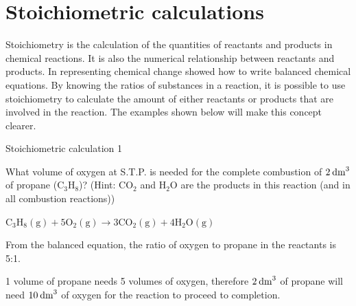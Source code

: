             \section{Stoichiometric calculations}
            \nopagebreak
      \label{m38712*id283990}Stoichiometry is the calculation of the quantities of reactants and products in chemical reactions. It is also the numerical relationship between reactants and products. In  representing chemical change showed how to write balanced chemical equations. By knowing the ratios of substances in a reaction, it is possible to use stoichiometry to calculate the amount of either reactants or products that are involved in the reaction. The examples shown below will make this concept clearer.\par 
\label{m38712*secfhsst!!!underscore!!!id1903}\vspace{.5cm}  
      \begin{wex}{Stoichiometric calculation 1 }
{

      \label{m38712*probfhsst!!!underscore!!!id1904}
      \label{m38712*id275479}What volume of oxygen at S.T.P. is needed for the complete combustion of $2\phantom{\rule{2pt}{0ex}}{\mathrm{dm}}^{3}$ of propane ($\mathrm{C}{}_{3}\mathrm{H}{}_{8}$)? (Hint: $\mathrm{CO}{}_{2}$ and $\mathrm{H}{}_{2}\mathrm{O}$ are the products in this reaction (and in all combustion reactions))\par 
      \vspace{5pt}}
{
      \label{m38712*id284189}${\mathrm{C}}_{3}{\mathrm{H}}_{8}\left(\mathrm{g}\right)+5{\mathrm{O}}_{2}\left(\mathrm{g}\right)\to 3\mathrm{C}{\mathrm{O}}_{2}\left(\mathrm{g}\right)+4{\mathrm{H}}_{2}\mathrm{O}\left(\mathrm{g}\right)$
      \par 
      \label{m38712*id284294}From the balanced equation, the ratio of oxygen to propane in the reactants is 5:1.\par 
      \label{m38712*id284304}1 volume of propane needs 5 volumes of oxygen, therefore $2\phantom{\rule{2pt}{0ex}}{\mathrm{dm}}^{3}$ of propane will need $10\phantom{\rule{2pt}{0ex}}{\mathrm{dm}}^{3}$ of oxygen for the reaction to proceed to completion.\par 
}
    \end{wex}
    \noindent
\label{m38712*secfhsst!!!underscore!!!id1972}\vspace{.5cm} 
